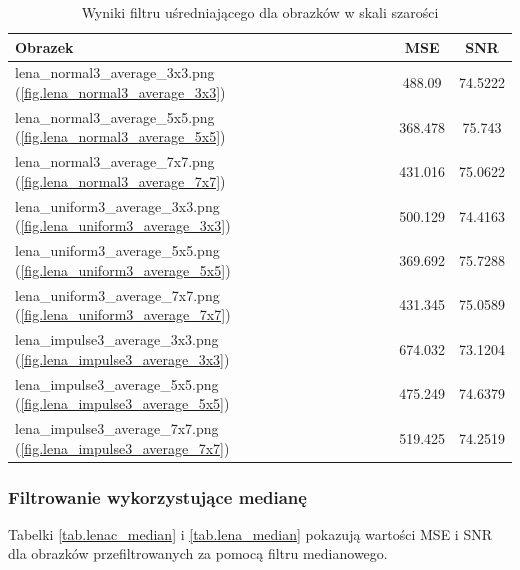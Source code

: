 \documentclass{classrep}
\begin{document}
\begin{table}
  \centering
  \begin{tabular}{|l|c|c|}
    \hline
    \textbf{Obrazek} & \textbf{MSE} & \textbf{SNR} \\
    \hline\hline
    lena\_normal3\_average\_3x3.png (\ref{fig.lena_normal3_average_3x3}) & 488.09 & 74.5222 \\
    \hline
    lena\_normal3\_average\_5x5.png (\ref{fig.lena_normal3_average_5x5}) & 368.478 & 75.743 \\
    \hline
    lena\_normal3\_average\_7x7.png (\ref{fig.lena_normal3_average_7x7}) & 431.016 & 75.0622 \\
    \hline
    lena\_uniform3\_average\_3x3.png (\ref{fig.lena_uniform3_average_3x3}) & 500.129 & 74.4163 \\
    \hline
    lena\_uniform3\_average\_5x5.png (\ref{fig.lena_uniform3_average_5x5}) & 369.692 & 75.7288 \\
    \hline
    lena\_uniform3\_average\_7x7.png (\ref{fig.lena_uniform3_average_7x7}) & 431.345 & 75.0589 \\
    \hline
    lena\_impulse3\_average\_3x3.png (\ref{fig.lena_impulse3_average_3x3}) & 674.032 & 73.1204 \\
    \hline
    lena\_impulse3\_average\_5x5.png (\ref{fig.lena_impulse3_average_5x5}) & 475.249 & 74.6379 \\
    \hline
    lena\_impulse3\_average\_7x7.png (\ref{fig.lena_impulse3_average_7x7}) & 519.425 & 74.2519 \\
    \hline
  \end{tabular}
  \caption{Wyniki filtru uśredniającego dla obrazków w skali szarości}
  \label{tab.lena_average}
\end{table}

\subsubsection{Filtrowanie wykorzystujące medianę}
Tabelki \ref{tab.lenac_median} i \ref{tab.lena_median} pokazują wartości MSE i SNR dla obrazków przefiltrowanych za pomocą filtru medianowego.
\end{document}
